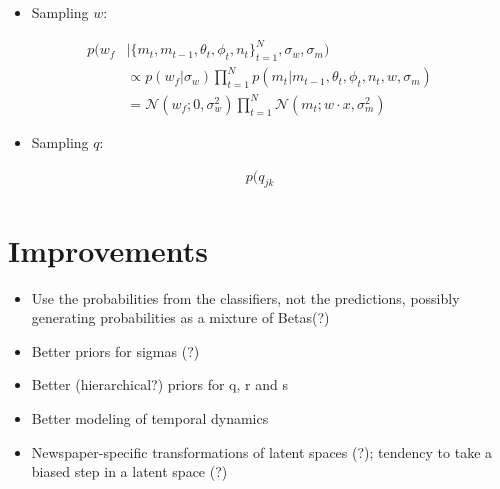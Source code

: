 \documentclass[11pt]{article}
\theoremstyle{plain}
\theoremstyle{definition}
\begin{document}
\begin{itemize}
\item Sampling $w$:
\end{itemize}
\begin{align*}
p(w_{f} &| \{m_t, m_{t-1}, \theta_t, \phi_t, n_t\}_{t=1}^N, \sigma_w, \sigma_m) \\
&\propto p(w_f | \sigma_w) \prod_{t=1}^N p(m_t  | m_{t-1}, \theta_t, \phi_t, n_t, w, \sigma_m) \\
&= \mathcal{N}(w_f ; 0, \sigma_w^2) \prod_{t=1}^N \mathcal{N}(m_t ; w \cdot x , \sigma_m^2)
\end{align*}

\begin{itemize}
\item Sampling $q$:
\end{itemize}
\begin{align*}
p(q_{jk} 
\end{align*}

\section{Improvements}


\begin{itemize}
\item Use the probabilities from the classifiers, not the predictions, possibly generating probabilities as a mixture of Betas(?)
\item Better priors for sigmas (?)
\item Better (hierarchical?) priors for q, r and s
\item Better modeling of temporal dynamics
\item Newspaper-specific transformations of latent spaces (?); tendency to take a biased step in a latent space (?)
\end{itemize}
 
\end{document}
